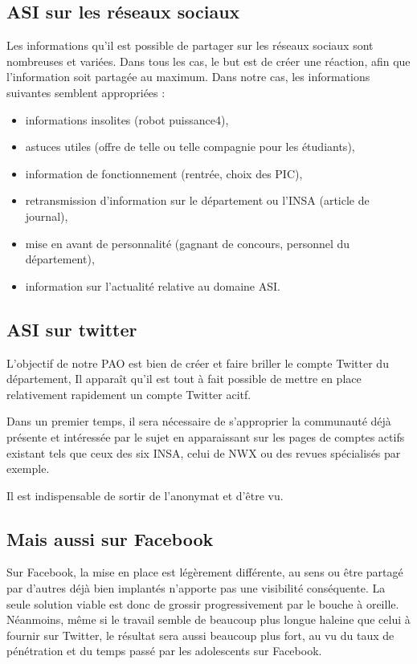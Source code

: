 \subsection{ASI sur les réseaux sociaux}
Les informations qu'il est possible de partager sur les réseaux sociaux sont nombreuses et variées. Dans tous les cas, le but est de 
créer une réaction, afin que l'information soit partagée au maximum. Dans notre cas, les informations suivantes semblent appropriées :
\begin{itemize}
	\item informations insolites (robot puissance4),
	\item astuces utiles (offre de telle ou telle compagnie pour les étudiants),
	\item information de fonctionnement (rentrée, choix des PIC),
	\item retransmission d'information sur le département ou l'INSA (article de journal),
	\item mise en avant de personnalité (gagnant de concours, personnel du département),
	\item information sur l'actualité relative au domaine ASI.
\end{itemize}


\subsection{ASI sur twitter}
L'objectif de notre PAO est bien de créer et faire briller le compte Twitter du département, Il apparaît qu'il est tout à fait possible 
de mettre en place relativement rapidement un compte Twitter acitf.

Dans un premier temps, il sera nécessaire de s'approprier la communauté déjà présente et intéressée par le sujet en apparaissant sur les 
pages de comptes actifs existant tels que ceux des six INSA, celui de NWX ou des revues spécialisés par exemple.

Il est indispensable de sortir de l'anonymat et d'être vu.

\subsection{Mais aussi sur Facebook}
Sur Facebook, la mise en place est légèrement différente, au sens ou être partagé par d'autres déjà bien implantés n'apporte pas une 
visibilité conséquente. La seule solution viable est donc de grossir progressivement par le bouche à oreille. Néanmoins, même si le travail 
semble de beaucoup plus longue haleine que celui à fournir sur Twitter, le résultat sera aussi beaucoup plus fort, au vu du taux de 
pénétration et du temps passé par les adolescents sur Facebook.
